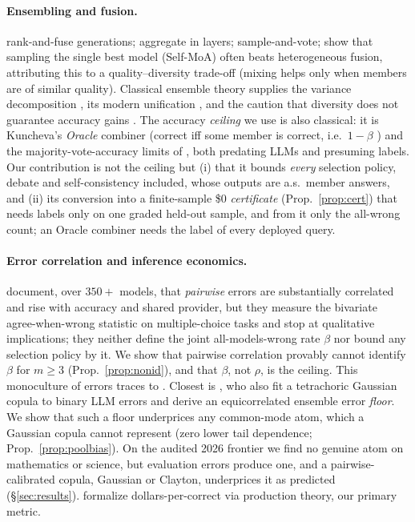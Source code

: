 \documentclass[11pt]{article}
\theoremstyle{plain}
\theoremstyle{definition}
\begin{document}
\paragraph{Ensembling and fusion.} \citet{jiang2023llmblender} rank-and-fuse generations; \citet{wang2024moa} aggregate
in layers; \citet{li2024moreagents} sample-and-vote; \citet{li2025selfmoa} show that sampling the single best model
(Self-MoA) often beats heterogeneous fusion, attributing this to a quality--diversity trade-off (mixing helps only when
members are of similar quality). Classical ensemble theory supplies the variance decomposition
\citep{krogh1995ensemble,ueda1996}, its modern unification \citep{wood2023diversity}, and the caution that diversity does
not guarantee accuracy gains \citep{kuncheva2003}. The accuracy \emph{ceiling} we use is also classical: it is Kuncheva's
\emph{Oracle} combiner (correct iff some member is correct, i.e.\ $1-\beta$ \citep{kuncheva2004combining}) and the
majority-vote-accuracy limits of \citet{kuncheva2003limits}, both predating LLMs and presuming labels. Our contribution is
not the ceiling but (i) that it bounds \emph{every} selection policy, debate and self-consistency included, whose outputs
are a.s.\ member answers, and (ii) its conversion into a finite-sample \$0 \emph{certificate} (Prop.~\ref{prop:cert}) that
needs labels only on one graded held-out sample, and from it only the all-wrong count; an Oracle combiner needs the label of
every deployed query.
\paragraph{Error correlation and inference economics.} \citet{kim2025correlated} document, over $350+$ models, that
\emph{pairwise} errors are substantially correlated and rise with accuracy and shared provider, but they measure the
bivariate agree-when-wrong statistic on multiple-choice tasks and stop at qualitative implications; they neither define the
joint all-models-wrong rate $\beta$ nor bound any selection policy by it. We show that pairwise correlation provably cannot
identify $\beta$ for $m\ge3$ (Prop.~\ref{prop:nonid}), and that $\beta$, not $\rho$, is the ceiling. This monoculture of
errors traces to \citet{kleinberg2021monoculture}. Closest is \citet{turkmen2026ensembleselection}, who also fit a
tetrachoric Gaussian copula to binary LLM errors and derive an equicorrelated ensemble error \emph{floor}. We show that such a
floor underprices any common-mode atom, which a Gaussian copula cannot represent (zero lower tail dependence;
Prop.~\ref{prop:poolbias}). On the audited 2026 frontier we find no genuine atom on mathematics or science, but evaluation
errors produce one, and a pairwise-calibrated copula, Gaussian or Clayton, underprices it as predicted
(\S\ref{sec:results}). \citet{erol2025costofpass} formalize dollars-per-correct via production theory, our primary metric.
\end{document}
